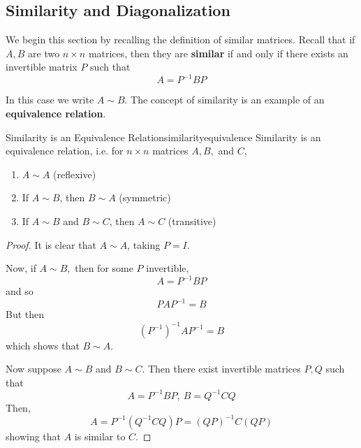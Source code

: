 \subsection{Similarity and Diagonalization}

We begin this section by recalling the definition  of similar matrices. 
Recall that if $A,B$ are two $n\times n$ matrices, then they are \textbf{similar}
if and only if there exists an invertible matrix $P$
such that
\begin{equation*}
A=P^{-1}BP
\end{equation*}

In this case we write $A \sim B$. The concept of similarity is an example of an \textbf{equivalence relation}.

\begin{lemma}{Similarity is an Equivalence Relation}{similarityequivalence}
Similarity is an equivalence relation, i.e. for $n \times n$ matrices $A,B,$ and $C$, 
\begin{enumerate}
\item $A \sim A$ (reflexive)
\item If $A \sim B$, then $B \sim A$ (symmetric)
\item If $A \sim B$ and $B \sim C$, then $A \sim C$ (transitive)
\end{enumerate}
\end{lemma}

\begin{proof}
It is clear that $A\sim A$, taking $P=I$. 

Now, if $A\sim B,$ then for some $P$ invertible,
\begin{equation*}
A=P^{-1}BP
\end{equation*}
and so
\begin{equation*}
PAP^{-1}=B
\end{equation*}
But then
\begin{equation*}
\left( P^{-1}\right) ^{-1}AP^{-1}=B
\end{equation*}
which shows that $B\sim A$.

Now suppose $A\sim B$ and $B\sim C$. Then there exist invertible matrices 
$P,Q$ such that
\begin{equation*}
A=P^{-1}BP,\ B=Q^{-1}CQ
\end{equation*}
Then,
\begin{equation*}
A=P^{-1} \left( Q^{-1}CQ \right)P=\left( QP\right) ^{-1}C\left( QP\right)
\end{equation*}
showing that $A$ is similar to $C$.
\end{proof}

